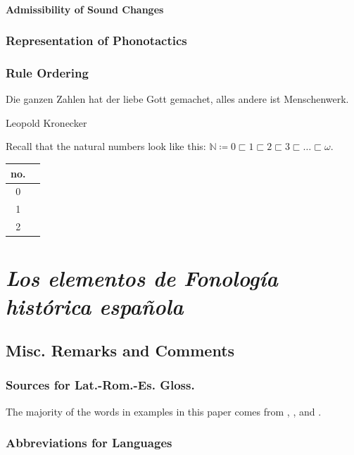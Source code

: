 \documentclass{report}[12pt]
\begin{document}
\subsection{Admissibility of Sound Changes}

\section{Representation of Phonotactics}

\section{Rule Ordering}

\epigraph{Die ganzen Zahlen hat der liebe Gott gemachet, alles andere ist Menschenwerk.}{Leopold Kronecker}

Recall that the natural numbers look like this: $\mathbb{N} \coloneq 0 \sqsubset 1 \sqsubset 2 \sqsubset 3 \sqsubset \dots \sqsubset \omega$.

\begin{center}
  \begin{tabular}{c|c}
    no. & \\
    \hline
    0 & \nameref{sec:deaffric_dental_affric} \\
    \hline
    1 & \nameref{sec:devoice_fric} \\
    \hline
    2 & \nameref{sec:desibil_dental_fric} \\
  \end{tabular}
\end{center}

\part{\emph{Los elementos de Fonología histórica española}}

\chapter{Misc. Remarks and Comments}

\section{Sources for Lat.-Rom.-Es. Gloss.}

The majority of the words in examples in this paper comes from \cite{romance_his}, \cite{lloyd_spanish}, and \cite{penny_spanish}.

\section{Abbreviations for Languages}
\end{document}
